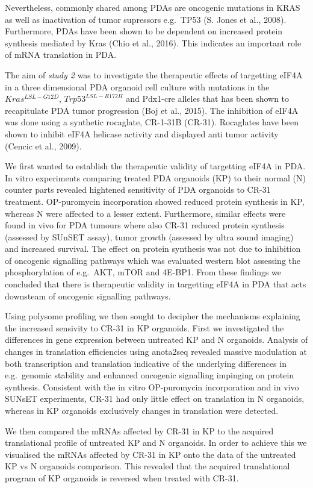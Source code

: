 \documentclass[12pt,openany]{book}
\begin{document}
Nevertheless, commonly shared among PDAs are oncogenic mutations in KRAS
as well as inactivation of tumor supressors e.g.~TP53 (S. Jones et al.,
2008). Furthermore, PDAs have been shown to be dependent on increased
protein synthesis mediated by Kras (Chio et al., 2016). This indicates
an important role of mRNA translation in PDA.

The aim of \emph{study 2} was to investigate the therapeutic effects of
targetting eIF4A in a three dimensional PDA organoid cell culture with
mutations in the \(Kras^{LSL-G12D}\), \(Trp53^{LSL-R172H}\) and Pdx1-cre
alleles that has been shown to recapitulate PDA tumor progression (Boj
et al., 2015). The inhibition of eIF4A was done using a synthetic
rocaglate, CR-1-31B (CR-31). Rocaglates have been shown to inhibit eIF4A
helicase activity and displayed anti tumor activity (Cencic et al.,
2009).

We first wanted to establish the therapeutic validity of targetting
eIF4A in PDA. In vitro experiments comparing treated PDA organoids (KP)
to their normal (N) counter parts revealed hightened sensitivity of PDA
organoids to CR-31 treatment. OP-puromycin incorporation showed reduced
protein synthesis in KP, whereas N were affected to a lesser extent.
Furthermore, similar effects were found in vivo for PDA tumours where
also CR-31 reduced protein synthesis (assessed by SUnSET assay), tumor
growth (assessed by ultra sound imaging) and increased survival. The
effect on protein synthesis was not due to inhibition of oncogenic
signalling pathways which was evaluated western blot assessing the
phosphorylation of e.g.~AKT, mTOR and 4E-BP1. From these findings we
concluded that there is therapeutic validity in targetting eIF4A in PDA
that acts downsteam of oncogenic signalling pathways.

Using polysome profiling we then sought to decipher the mechanisms
explaining the increased sensivity to CR-31 in KP organoids. First we
investigated the differences in gene expression between untreated KP and
N organoids. Analysis of changes in translation efficiencies using
anota2seq revealed massive modulation at both transcription and
translation indicative of the underlying differences in e.g.~genomic
stability and enhanced oncogenic signalling impinging on protein
synthesis. Consistent with the in vitro OP-puromycin incorporation and
in vivo SUNsET experiments, CR-31 had only little effect on translation
in N organoids, whereas in KP organoids exclusively changes in
translation were detected.

We then compared the mRNAs affected by CR-31 in KP to the acquired
translational profile of untreated KP and N organoids. In order to
achieve this we visualised the mRNAs affected by CR-31 in KP onto the
data of the untreated KP vs N organoids comparison. This revealed that
the acquired translational program of KP organoids is reversed when
treated with CR-31.
\end{document}
